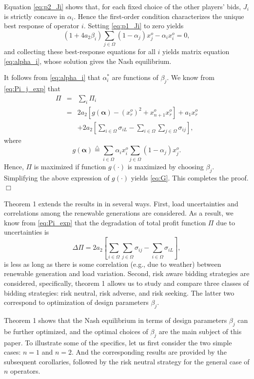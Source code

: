 \documentclass[conference]{IEEEtran}
\begin{document}
Equation \eqref{eq:p2_Ji} shows that, for each fixed choice of the other players' bids, $J_i$ is strictly concave in $\alpha_i$. Hence the first-order condition characterizes the unique best response of operator $i$. Setting \eqref{eq:p1_Ji} to zero yields
\begin{equation}
   (1+4a_2\beta_i) \sum_{j\in\Omega}(1-\alpha_j)x_j^o 
- \alpha_i x_i^o=0, \label{eq:p1Ji=0}
\end{equation}  
and collecting these best-response equations for all $i$ yields matrix equation \eqref{eq:alpha_i}, whose solution gives the Nash equilibrium.

It follows from \eqref{eq:alpha_i} that $\alpha_i^*$ are functions of $\beta_j$. We know from  \eqref{eq:Pi_j_exp} that 
\begin{eqnarray}
    \Pi & = & \sum_i \Pi_i \nonumber \\
     & = & 2a_2\left[ g(\boldsymbol{\alpha}) - \left(x_r^o\right)^2 + x_{n+1}^o x_r^o\right]  +a_1 x_r^o  \nonumber \\ 
     && + 2a_2 \left[ \sum_{i\in\Omega} \sigma_{iL} -\sum_{i\in\Omega}\sum_{j\in\Omega}\sigma_{ij}\right], \label{eq:Pi_exp}
\end{eqnarray}
where
\[ g(\boldsymbol{\alpha}) \stackrel{\triangle}{=} \sum_{i\in\Omega}  \alpha_i x_i^o  \sum_{j\in\Omega} (1-\alpha_j ) x_j^o. \]
Hence, $\Pi$ is maximized if function $g(\cdot)$ is maximized by choosing $\beta_j$.
Simplifying the above expression of $g(\cdot)$ yields \eqref{eq:G}. This completes the proof. \hfill $\Box$

Theorem 1 extends the results in \cite{Chow2017} in several ways. First, load uncertainties and correlations among the renewable generations are considered.  As a result, we know from \eqref{eq:Pi_exp} that the degradation of total profit function $\Pi$ due to uncertainties is 
\[ \Delta \Pi = 2a_2 \left[ \sum_{i\in\Omega}\sum_{j\in\Omega}\sigma_{ij}- \sum_{i\in\Omega} \sigma_{iL}\right], \]
is less as long as there is some correlation (e.g., due to weather) between renewable generation and load variation. Second, risk aware bidding strategies are considered, specifically, theorem 1 allows us to study and compare three classes of bidding strategies: risk neutral, risk adverse, and risk seeking. The latter two correspond to optimization of design parameters $\beta_j$. 

Theorem 1 shows that the Nash equilibrium in terms of design parameters $\beta_j$ can be further optimized, and the optimal choices of $\beta_j$ are the main subject of this paper. To illustrate some of the specifics, let us first consider the two simple cases: $n=1$ and $n=2$. And the corresponding results are provided by the subsequent corollaries, followed by the risk neutral strategy for the general case of $n$ operators. 
\end{document}
